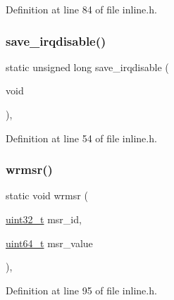 Definition at line 84 of file inline.\+h.

\mbox{\label{a00026_ab1dca2d7fd57d56f7548a81ef081ba74_ab1dca2d7fd57d56f7548a81ef081ba74}} 
\subsubsection{\texorpdfstring{save\+\_\+irqdisable()}{save\_irqdisable()}}
{\footnotesize\ttfamily static unsigned long save\+\_\+irqdisable (\begin{DoxyParamCaption}\item[{void}]{ }\end{DoxyParamCaption})\hspace{0.3cm}{\ttfamily [inline]}, {\ttfamily [static]}}



Definition at line 54 of file inline.\+h.

\mbox{\label{a00026_a368f08346121290f513a26011e0f68f8_a368f08346121290f513a26011e0f68f8}} 
\subsubsection{\texorpdfstring{wrmsr()}{wrmsr()}}
{\footnotesize\ttfamily static void wrmsr (\begin{DoxyParamCaption}\item[{\hyperlink{a00023_a435d1572bf3f880d55459d9805097f62_a435d1572bf3f880d55459d9805097f62}{uint32\+\_\+t}}]{msr\+\_\+id,  }\item[{\hyperlink{a00023_aa232ecf786a74ce5363c36c10798d2b1_aa232ecf786a74ce5363c36c10798d2b1}{uint64\+\_\+t}}]{msr\+\_\+value }\end{DoxyParamCaption})\hspace{0.3cm}{\ttfamily [inline]}, {\ttfamily [static]}}



Definition at line 95 of file inline.\+h.


